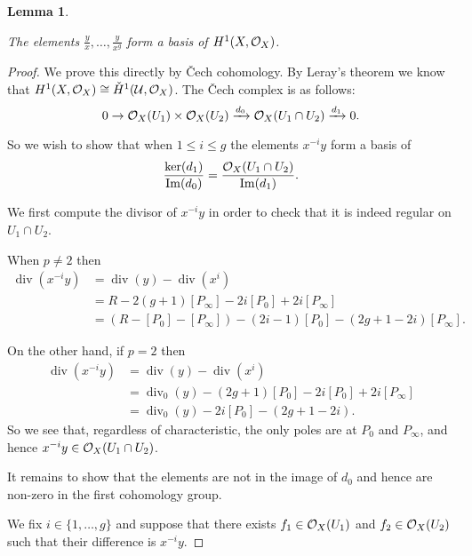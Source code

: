 \documentclass[draft, 11pt]{article} %
\theoremstyle{plain}
\newtheorem{lem}[defn]{Lemma}
\theoremstyle{remark}
\newcommand{\cO}{{\cal O}}
\newcommand{\cU}{{\mathcal U}}
\newcommand{\cech}{\v{C}ech }
\DeclareMathOperator{\di}{div}
\DeclareMathOperator{\Ima}{Im}
\begin{document}
{\begin{lem}\label{basish1}
 
 The elements $\frac{y}{x}, \ldots , \frac{y}{x^g}$ form a basis of $H^1(X,\cO_X)$.
 
\end{lem}
\begin{proof}
 
We prove this directly by \cech cohomology.
By Leray's theorem  we know that $H^1(X,\cO_X) \cong \check{H}^1(\cU,\cO_X)$.
The \cech complex is as follows:
\begin{equation*}
0 \rightarrow \cO_X(U_1) \times \cO_X(U_2) \xrightarrow{d_0} \cO_X(U_1 \cap U_2) \xrightarrow{d_1} 0.
\end{equation*}

So we wish to show that when $1 \leq i \leq g$ the elements $x^{-i}y$ form a basis of 
\begin{equation*}
\frac{\ker (d_1)}{\Ima (d_0)} = \frac{ \cO_X(U_1 \cap U_2)}{\Ima (d_1)}.
\end{equation*}


We first compute the divisor of $x^{-i}y$ in order to check that it is indeed regular on $U_1 \cap U_2$.

When $p \neq 2$ then
\begin{align*}
    \di(x^{-i}y) & = \di(y) - \di(x^i) \\
    & = R - 2(g+1)[P_\infty] - 2i[P_0] + 2i[P_\infty] \\
    & = (R - [P_0] - [P_\infty]) -(2i-1)[P_0] - (2g +1 -2i)[P_\infty].
\end{align*}

On the other hand, if $p =2$ then 
\begin{align*}
    \di(x^{-i}y) & = \di(y) - \di(x^i) \\
    & = \di_0(y) - (2g+1)[P_0] -2i[P_0] + 2i[P_\infty] \\
    & = \di_0(y) -2i[P_0] - ( 2g + 1 -2i).
\end{align*}
So we see that, regardless of characteristic, the only poles are at $P_0$ and $P_\infty$, and hence $x^{-i}y \in \cO_X(U_1 \cap U_2)$.

It remains to show that the elements are not in the image of $d_0$ and hence are non-zero in the first cohomology group.

We  fix $i \in \{1, \ldots, g\}$ and suppose that there exists $f_1 \in \cO_X(U_1)$ and $f_2 \in \cO_X(U_2)$ such that their difference is $x^{-i}y$.



\end{proof}}
\end{document}
